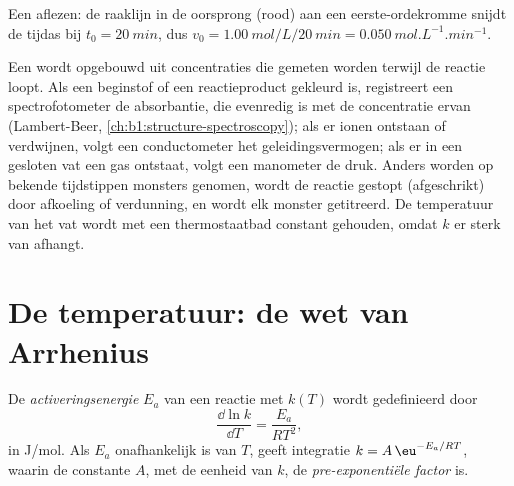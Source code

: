 \begin{omfigure}

{\small Een  aflezen: de raaklijn in de oorsprong (rood) aan
een eerste-ordekromme snijdt de tijdas bij $t_0 = \qty{20}{min}$, dus
$v_0 =
\qty{1.00}{mol/L}/\qty{20}{min} = \qty{0.050}{mol.L^{-1}.min^{-1}}$.}
\end{omfigure}

\begin{inthelab}
Een  wordt opgebouwd uit concentraties die gemeten worden
terwijl de reactie loopt. Als een beginstof of een reactieproduct
gekleurd is, registreert een spectrofotometer de absorbantie, die
evenredig is met de concentratie ervan (Lambert-Beer,
\cref{ch:b1:structure-spectroscopy}); als er ionen ontstaan of
verdwijnen, volgt een conductometer het geleidingsvermogen; als er in een
gesloten vat een gas ontstaat, volgt een manometer de druk. Anders worden
op bekende tijdstippen monsters genomen, wordt de reactie gestopt
(afgeschrikt) door afkoeling of verdunning, en wordt elk monster
getitreerd. De temperatuur van het vat wordt met een thermostaatbad
constant gehouden, omdat $k$ er sterk van afhangt.
\end{inthelab}

\section{De temperatuur: de wet van Arrhenius}

\begin{definition}[Activeringsenergie]\label{def:b1:rate-laws:activation-energy}
De \emph{activeringsenergie} $E_a$ van een
reactie met  $k(T)$ wordt gedefinieerd door
\[
  \frac{\dd \ln k}{\dd T} = \frac{E_a}{RT^2} ,
\]
in \unit{J/mol}. Als $E_a$ onafhankelijk is van $T$, geeft integratie
$k = A\,\eu^{-E_a/RT}$, waarin de constante $A$, met de eenheid van $k$,
de \emph{pre-exponentiële
factor} is.
\end{definition}

